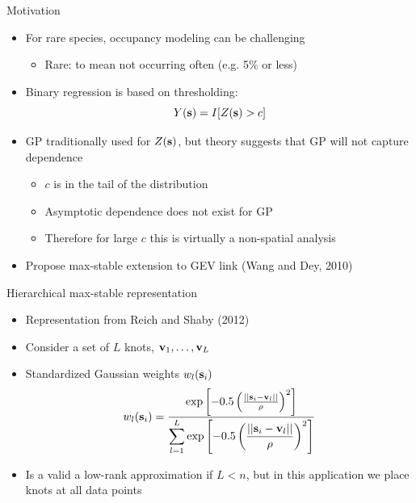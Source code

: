 \documentclass{beamer}
\begin{document}
\begin{frame}{Motivation}
	\begin{itemize} \setlength{\itemsep}{1em}
		\item For rare species, occupancy modeling can be challenging \vspace{0.5em}
		\begin{itemize} \setlength{\itemsep}{0.5em}
			\item \alert{Rare}: to mean not occurring often (e.g. 5\% or less)
		\end{itemize}
		\item Binary regression is based on thresholding: $$Y(\mathbf{s}) = I[Z(\mathbf{s}) > c]$$
		\item GP traditionally used for $Z(\mathbf{s})$, but theory suggests that GP will not capture dependence  \vspace{0.5em}
		\begin{itemize} \setlength{\itemsep}{0.5em}
			\item $c$ is in the tail of the distribution
			\item Asymptotic dependence does not exist for GP
			\item Therefore for large $c$ this is virtually a non-spatial analysis
		\end{itemize}
		\item Propose max-stable extension to GEV link (Wang and Dey, 2010)
	\end{itemize}
\end{frame}

\begin{frame}{Hierarchical max-stable representation}
	\begin{itemize} \setlength{\itemsep}{1em}
    \item Representation from Reich and Shaby (2012)
		\item Consider a set of $L$ knots, $\mathbf{v}_1, \ldots, \mathbf{v}_L$
		\item Standardized Gaussian weights $w_l(\mathbf{s}_i)$
		\begin{align*}
		w_l(\mathbf{s}_i) = \frac{ \exp\left[ -0.5 \left( \frac{ || \mathbf{s}_i - \mathbf{v}_l || }{ \rho} \right)^2 \right]}{ \displaystyle \sum_{l = 1}^L \exp\left[ -0.5 \left( \frac{ || \mathbf{s}_i - \mathbf{v}_l || }{ \rho} \right)^2 \right] }
		\end{align*}
		\item Is a valid a low-rank approximation if $L < n$, but in this application we place knots at all data points
	\end{itemize}
\end{frame}
\end{document}
